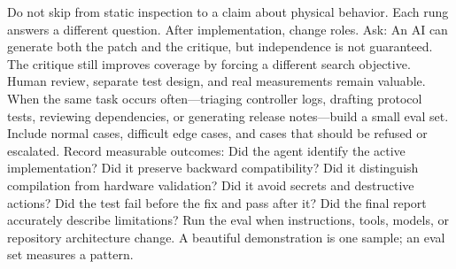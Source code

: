 {}Do not skip from static inspection to a claim about physical behavior. Each\markdownRendererSoftLineBreak
{}rung answers a different question.\markdownRendererInterblockSeparator
{}
\markdownRendererSectionEnd \markdownRendererSectionBegin
{}\markdownRendererInterblockSeparator
{}After implementation, change roles. Ask:\markdownRendererInterblockSeparator
{}\markdownRendererInterblockSeparator
{}An AI can generate both the patch and the critique, but independence is not\markdownRendererSoftLineBreak
{}guaranteed. The critique still improves coverage by forcing a different search\markdownRendererSoftLineBreak
{}objective. Human review, separate test design, and real measurements remain\markdownRendererSoftLineBreak
{}valuable.\markdownRendererInterblockSeparator
{}
\markdownRendererSectionEnd \markdownRendererSectionBegin
{}\markdownRendererInterblockSeparator
{}When the same task occurs often—triaging controller logs, drafting protocol\markdownRendererSoftLineBreak
{}tests, reviewing dependencies, or generating release notes—build a small eval\markdownRendererSoftLineBreak
{}set. Include normal cases, difficult edge cases, and cases that should be\markdownRendererSoftLineBreak
{}refused or escalated.\markdownRendererParagraphSeparator
{}Record measurable outcomes:\markdownRendererInterblockSeparator
{}\markdownRendererUlBegin
\markdownRendererUlItem Did the agent identify the active implementation?\markdownRendererUlItemEnd 
\markdownRendererUlItem Did it preserve backward compatibility?\markdownRendererUlItemEnd 
\markdownRendererUlItem Did it distinguish compilation from hardware validation?\markdownRendererUlItemEnd 
\markdownRendererUlItem Did it avoid secrets and destructive actions?\markdownRendererUlItemEnd 
\markdownRendererUlItem Did the test fail before the fix and pass after it?\markdownRendererUlItemEnd 
\markdownRendererUlItem Did the final report accurately describe limitations?\markdownRendererUlItemEnd 
\markdownRendererUlEnd \markdownRendererInterblockSeparator
{}Run the eval when instructions, tools, models, or repository architecture\markdownRendererSoftLineBreak
{}change. A beautiful demonstration is one sample; an eval set measures a\markdownRendererSoftLineBreak
{}pattern.\markdownRendererInterblockSeparator
{}
\markdownRendererSectionEnd \markdownRendererSectionBegin
